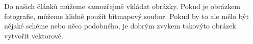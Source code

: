 \documentclass[11pt,a4paper]{article}
\begin{document}
      Do našich článků můžeme samozřejmě vkládat obrázky. Pokud je obrázkem fotografie, můžeme klidně použít bitmapový soubor. Pokud by to ale mělo být nějaké schéme nebo něco podobného, je dobrým zvykem takovýto obrázek vytvořit vektorově.
    \begin{figure}[ht]
  \begin{center}
\end{center}
\end{figure}
\end{document}
